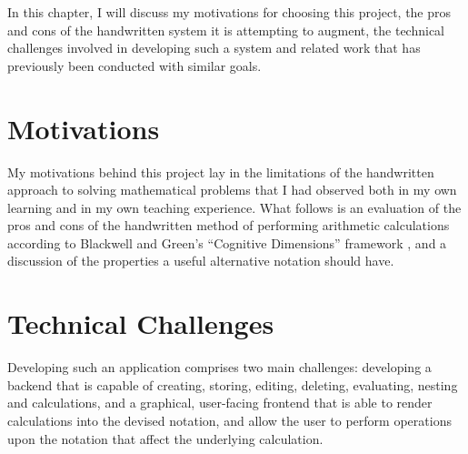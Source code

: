 \documentclass[12pt,twoside,notitlepage,xetex]{report}
\begin{document}
In this chapter, I will discuss my motivations for choosing this project, the
pros and cons of the handwritten system it is attempting to augment, the
technical challenges involved in developing such a system and related work that
has previously been conducted with similar goals.

\section{Motivations}

My motivations behind this project lay in the limitations of the handwritten
approach to solving mathematical problems that I had observed both in my own
learning and in my own teaching experience.  What follows is an evaluation of
the pros and cons of the handwritten method of performing arithmetic
calculations according to Blackwell and Green's ``Cognitive Dimensions''
framework \cite{Blackwell1998}, and a discussion of the properties a useful
alternative notation should have.

\pagebreak



\section{Technical Challenges}

Developing such an application comprises two main challenges: developing a
backend that is capable of creating, storing, editing, deleting, evaluating,
nesting and calculations, and a graphical, user-facing frontend that is able to
render calculations into the devised notation, and allow the user to perform
operations upon the notation that affect the underlying calculation.
\end{document}

